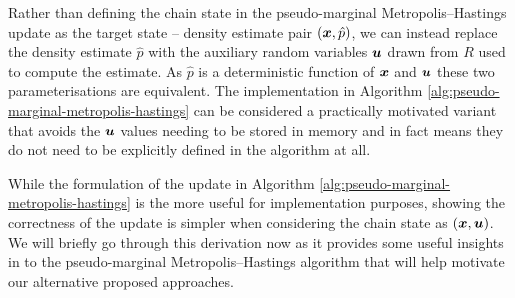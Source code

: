 


Rather than defining the chain state in the pseudo-marginal Metropolis--Hastings update as the target state -- density estimate pair $(\boldsymbol{x},\hat{p})$, we can instead replace the density estimate $\hat{p}$ with the auxiliary random variables $\boldsymbol{u}$ drawn from $R$ used to compute the estimate. As $\hat{p}$ is a deterministic function of $\boldsymbol{x}$ and $\boldsymbol{u}$ these two parameterisations are equivalent. The implementation in Algorithm \ref{alg:pseudo-marginal-metropolis-hastings} can be considered a practically motivated variant that avoids the $\boldsymbol{u}$ values needing to be stored in memory and in fact means they do not need to be explicitly defined in the algorithm at all.

While the formulation of the update in Algorithm \ref{alg:pseudo-marginal-metropolis-hastings} is the more useful for implementation purposes, showing the correctness of the update is simpler when considering the chain state as $(\boldsymbol{x},\boldsymbol{u})$. We will briefly go through this derivation now as it provides some useful insights in to the pseudo-marginal Metropolis--Hastings algorithm that will help motivate our alternative proposed approaches.

